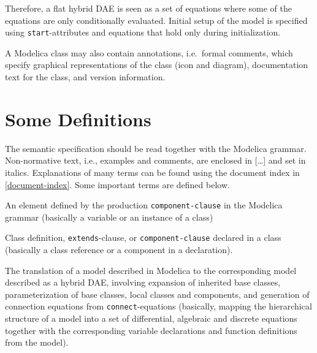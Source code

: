 Therefore, a flat hybrid DAE is seen as a set of equations where some of the equations are only conditionally evaluated.
Initial setup of the model is specified using \lstinline!start!-attributes and equations that hold only during initialization.

A Modelica class may also contain annotations, i.e.\ formal comments, which specify graphical representations of the class (icon and diagram), documentation text for the class, and version information.

\section{Some Definitions}\label{some-definitions}

The semantic specification should be read together with the Modelica grammar.
Non-normative text, i.e., examples and comments, are enclosed in {[}\ldots{]} and set in italics.
Explanations of many terms can be found using the document index in \cref{document-index}.
Some important terms are defined below.

\begin{definition}[Component]
An element defined by the production \lstinline[language=grammar]!component-clause! in the Modelica grammar (basically a variable or an instance of a class)
\end{definition}

\begin{definition}[Element]
Class definition, \lstinline!extends!-clause, or \lstinline[language=grammar]!component-clause! declared in a class (basically a class reference or a component in a declaration).
\end{definition}

\begin{definition}[Flattening]
The translation of a model described in Modelica to the corresponding model described as a hybrid DAE, involving expansion of inherited base classes, parameterization of base classes, local classes
and components, and generation of connection equations from \lstinline!connect!-equations (basically, mapping the hierarchical structure of a model into a set of differential, algebraic and discrete equations together with the corresponding variable declarations and function definitions from the model).
\end{definition}



